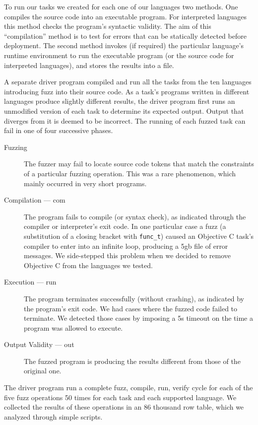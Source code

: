 \documentclass[10pt]{sigplanconf}
\begin{document}
To run our tasks we created for each one of our languages two methods.
One compiles the source code into an executable program.
For interpreted languages this method checks the program's syntactic validity.
The aim of this ``compilation'' method is to test for errors that can
be statically detected before deployment.
The second method invokes (if required) the particular language's
runtime environment to run the executable program
(or the source code for interpreted languages),
and stores the results into a file.

A separate driver program compiled and run all the tasks from the ten
languages introducing fuzz into their source code.
As a task's programs written in different languages produce slightly
different results,
the driver program first runs an unmodified version of each task
to determine its expected output.
Output that diverges from it is deemed to be incorrect.
The running of each fuzzed task can fail in one of four successive
phases.
\begin{description}
\item[Fuzzing]
The fuzzer may fail to locate source code tokens that match the
constraints of a particular fuzzing operation.
This was a rare phenomenon, which mainly occurred in very short programs.
\item[Compilation --- com]
The program fails to compile (or syntax check),
as indicated through the compiler or interpreter's exit code.
In one particular case a fuzz
(a substitution of a closing bracket with {\tt func\_t})
caused an Objective C task's compiler
to enter into an infinite loop,
producing a 5{\sc gb} file of error messages.
We side-stepped this problem when we decided to remove Objective C from
the languages we tested.
\item[Execution --- run]
The program terminates successfully (without crashing),
as indicated by the program's exit code.
We had cases where the fuzzed code failed to terminate.
We detected those cases by imposing a 5s timeout on the time a program
was allowed to execute.
\item[Output Validity --- out]
The fuzzed program is producing the results different from those of
the original one.
\end{description}

The driver program run a complete fuzz, compile, run, verify cycle
for each of the five fuzz operations 50 times for
each task and each supported language.
We collected the results of these operations in an 86 thousand row
table,
which we analyzed through simple scripts.
\end{document}
